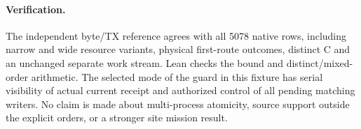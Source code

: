 \documentclass{article}
\begin{document}
\paragraph{Verification.}
The independent byte/TX reference agrees with all 5078 native
rows, including narrow and wide resource variants, physical
first-route outcomes, distinct C and an unchanged separate
work stream. Lean checks the bound and distinct/mixed-order
arithmetic. The selected mode of the guard in this fixture has
serial visibility of actual current receipt and authorized
control of all pending matching writers. No claim is made about
multi-process atomicity, source support outside the explicit
orders, or a stronger site mission result.
\end{document}
